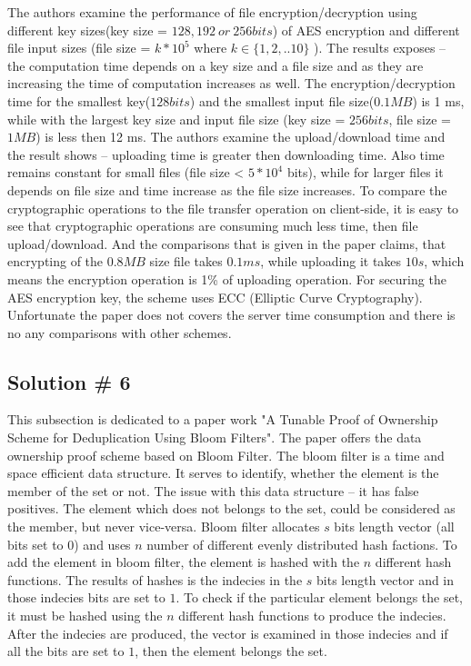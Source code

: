 \documentclass[12pt]{article}
\begin{document}
The authors examine the performance of file encryption/decryption using different key sizes(key size = $128, 192\ or\ 256 bits$) of AES encryption and different file input sizes (file size = $k * 10^5$ where $k \in \{ 1,2,..10\}$ ).  The results  exposes -- the computation time depends on a key size and a file size and as they are increasing the time of computation increases as well. The encryption/decryption time for the smallest key($128 bits$) and the smallest input file size($0.1 MB$) is 1 ms, while with the largest key size and input file size (key size = $256 bits$, file size = $1MB$) is less then 12 ms.  The authors examine the upload/download time and the result shows -- uploading time is greater then downloading time. Also time remains constant for small files (file size < $5*10^4$ bits), while for  larger files it depends on file size and time increase as the file size increases. To compare the cryptographic operations to the file transfer operation on client-side, it is easy to see that cryptographic operations are consuming much less time, then file upload/download. And the comparisons that is given in the paper \cite{CovergentEnc} claims, that encrypting of the  $0.8 MB$  size file takes $0.1ms$, while uploading it takes $10s$, which means the encryption operation is 1\% of uploading operation. For securing the AES encryption key, the scheme uses ECC (Elliptic Curve Cryptography).\cite{ECC}  Unfortunate the paper\cite{CovergentEnc} does not covers the server time consumption and there is no any comparisons with other schemes. 


\subsection{Solution \# 6}
\label{sub:Soltuion6}
This subsection is dedicated to a paper work "A Tunable Proof of Ownership Scheme for Deduplication Using Bloom Filters".\cite{BF} The paper offers  the data ownership proof scheme based on Bloom Filter.\cite{BF-Original} The bloom filter is a time and space efficient data structure. It serves to identify, whether the element is  the member of the set or not. The issue with this data structure -- it has false positives. The element which does not belongs to the set, could be considered as the member, but never vice-versa. Bloom filter allocates $s$ bits length vector (all bits set to $0$) and uses $n$ number of different evenly distributed hash factions. To add the element in bloom filter, the element is hashed with the $n$ different hash functions. The results of hashes is the indecies in the $s$ bits length vector and in those indecies bits are set to $1$. To check if the particular element belongs the set, it must be hashed using the $n$ different hash functions to produce the indecies. After the indecies are produced, the vector is examined in those indecies and if all the bits are set to $1$, then the  element belongs the set.
\end{document}
